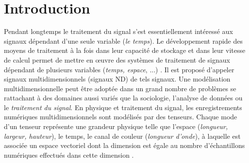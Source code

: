 \documentclass[11pt,a4paper,oneside]{book}
\begin{document}
\section*{Introduction}
Pendant longtemps le traitement du signal s'est essentiellement
intéressé aux signaux dépendant d'une seule
variable (\textit{le temps}). Le développement rapide des
moyens de traitement à la fois dans leur capacité de
stockage et dans leur vitesse de calcul permet de
mettre en œuvre des systèmes de traitement de signaux
dépendant de plusieurs variables (\textit{temps, espace}, ...) \cite[p.87]{LACOUME1998}. Il est proposé d'appeler signaux multidimensionnels
(signaux ND) de tels signaux.
Une modélisation multidimensionnelle peut être adoptée dans
un grand nombre de problèmes se rattachant à des domaines
aussi variés que la sociologie, l'analyse de données ou le \textit{traitement
	du signal}. En physique et traitement du signal, les
enregistrements numériques multidimensionnels sont modélisés par des tenseurs. Chaque mode d'un tenseur représente une
grandeur physique telle que l'espace (\textit{longueur, largeur, hauteur}),
le temps, le canal de couleur (\textit{longueur d'onde}), à laquelle
est associée un espace vectoriel dont la dimension est égale au
nombre d'échantillons numériques effectués dans cette dimension \cite[p.1]{MUTIfrance}.

%
\end{document}
